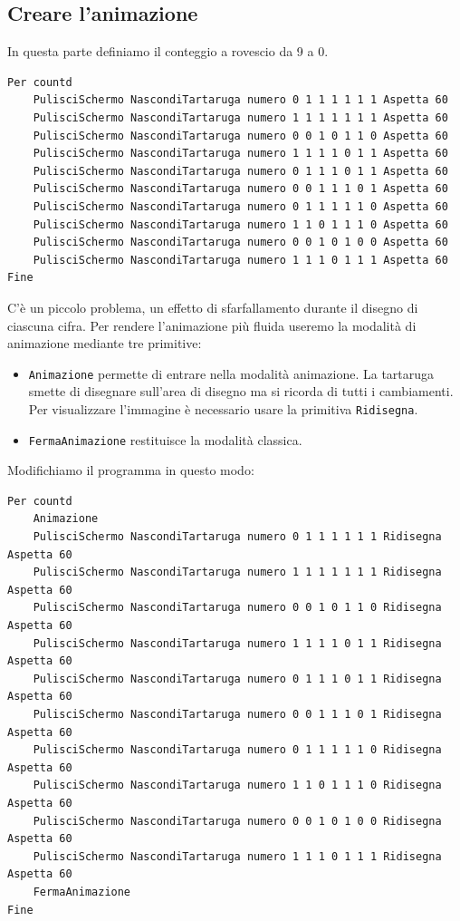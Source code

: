 \subsection{Creare l'animazione}
In questa parte definiamo il conteggio a rovescio da 9 a 0.

\begin{lstlisting}[caption="Conteggio a rovescio da 9 a 0"]
Per countd
	PulisciSchermo NascondiTartaruga numero 0 1 1 1 1 1 1 Aspetta 60
	PulisciSchermo NascondiTartaruga numero 1 1 1 1 1 1 1 Aspetta 60
	PulisciSchermo NascondiTartaruga numero 0 0 1 0 1 1 0 Aspetta 60
	PulisciSchermo NascondiTartaruga numero 1 1 1 1 0 1 1 Aspetta 60
	PulisciSchermo NascondiTartaruga numero 0 1 1 1 0 1 1 Aspetta 60
	PulisciSchermo NascondiTartaruga numero 0 0 1 1 1 0 1 Aspetta 60
	PulisciSchermo NascondiTartaruga numero 0 1 1 1 1 1 0 Aspetta 60
	PulisciSchermo NascondiTartaruga numero 1 1 0 1 1 1 0 Aspetta 60
	PulisciSchermo NascondiTartaruga numero 0 0 1 0 1 0 0 Aspetta 60
	PulisciSchermo NascondiTartaruga numero 1 1 1 0 1 1 1 Aspetta 60
Fine
\end{lstlisting}

C'è un piccolo problema, un effetto di sfarfallamento durante il disegno di ciascuna cifra. Per rendere l'animazione più fluida useremo la modalità di animazione mediante tre primitive:
\begin{itemize}
	\item \texttt{Animazione} permette di entrare nella modalità animazione. La tartaruga smette di disegnare sull'area di disegno ma si ricorda di tutti i cambiamenti. Per visualizzare l'immagine è necessario usare la primitiva \texttt{Ridisegna}.
	\item  \texttt{FermaAnimazione} restituisce la modalità classica.
\end{itemize}

Modifichiamo il programma in questo modo:
\begin{lstlisting}[caption="Animazione del conteggio a rovescio da 9 a 0"]
Per countd
	Animazione
	PulisciSchermo NascondiTartaruga numero 0 1 1 1 1 1 1 Ridisegna Aspetta 60
	PulisciSchermo NascondiTartaruga numero 1 1 1 1 1 1 1 Ridisegna Aspetta 60
	PulisciSchermo NascondiTartaruga numero 0 0 1 0 1 1 0 Ridisegna Aspetta 60
	PulisciSchermo NascondiTartaruga numero 1 1 1 1 0 1 1 Ridisegna Aspetta 60
	PulisciSchermo NascondiTartaruga numero 0 1 1 1 0 1 1 Ridisegna Aspetta 60
	PulisciSchermo NascondiTartaruga numero 0 0 1 1 1 0 1 Ridisegna Aspetta 60
	PulisciSchermo NascondiTartaruga numero 0 1 1 1 1 1 0 Ridisegna Aspetta 60
	PulisciSchermo NascondiTartaruga numero 1 1 0 1 1 1 0 Ridisegna Aspetta 60
	PulisciSchermo NascondiTartaruga numero 0 0 1 0 1 0 0 Ridisegna Aspetta 60
	PulisciSchermo NascondiTartaruga numero 1 1 1 0 1 1 1 Ridisegna Aspetta 60
	FermaAnimazione
Fine
\end{lstlisting}



